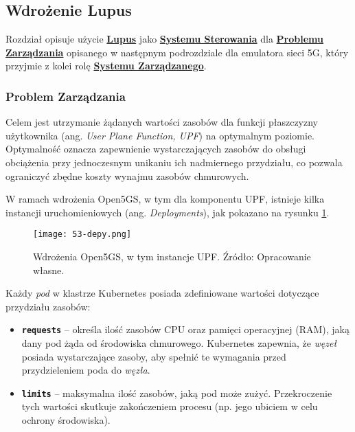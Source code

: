 \subsection{Wdrożenie Lupus}

Rozdział opisuje użycie \hyperlink{def:lupus}{\textbf{Lupus}} jako \hyperlink{def:system-sterowania}{\textbf{Systemu Sterowania}} dla \hyperlink{def:problem-zarzadzania}{\textbf{Problemu Zarządzania}} opisanego w następnym podrozdziale dla emulatora sieci 5G, który przyjmie z kolei rolę \hyperlink{def:system-zarzadzany}{\textbf{Systemu Zarządzanego}}. 

\subsubsection{Problem Zarządzania}

Celem jest utrzymanie żądanych wartości zasobów dla funkcji płaszczyzny użytkownika (ang. \textit{User Plane Function, UPF}) na optymalnym poziomie. Optymalność oznacza zapewnienie wystarczających zasobów do obsługi obciążenia przy jednoczesnym unikaniu ich nadmiernego przydziału, co pozwala ograniczyć zbędne koszty wynajmu zasobów chmurowych.

W ramach wdrożenia Open5GS, w tym dla komponentu UPF, istnieje kilka instancji uruchomieniowych (ang. \textit{Deployments}), jak pokazano na rysunku \ref{fig:53-depy}.

\begin{figure}[!h]
    \centering \texttt{[image: 53-depy.png]}
    \caption{Wdrożenia Open5GS, w tym instancje UPF. Źródło: Opracowanie własne.}\label{fig:53-depy}
\end{figure}

Każdy \textit{pod} w klastrze Kubernetes posiada zdefiniowane wartości dotyczące przydziału zasobów:

\begin{itemize}
    \item \textbf{\texttt{requests}} – określa ilość zasobów CPU oraz pamięci operacyjnej (RAM), jaką dany pod żąda od środowiska chmurowego. Kubernetes zapewnia, że \textit{węzeł} posiada wystarczające zasoby, aby spełnić te wymagania przed przydzieleniem poda do \textit{węzła}.
    \item \textbf{\texttt{limits}} – maksymalna ilość zasobów, jaką pod może zużyć. Przekroczenie tych wartości skutkuje zakończeniem procesu (np. jego ubiciem w celu ochrony środowiska).
\end{itemize}


